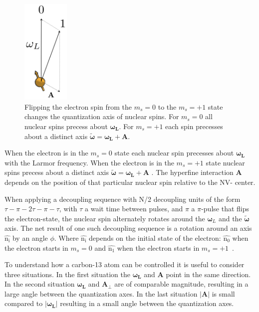 \begin{figure}[htbp]
\centering
\includegraphics[keepaspectratio,width=0.2\textwidth,height=0.75\textheight]{./img/QuantizationAxis.png}
\caption{Flipping the electron spin from the  $m_s=0$ to the $m_s= +1$ state changes the quantization axis of nuclear spins. For  $m_s=0$ all nuclear spins precess about $\bm{\omega_L}$. For  $m_s=+1$ each spin precesses about a distinct axis $\bm{\tilde{\omega}}=\bm{\omega_L} +\bm{A}$.}
\label{fig:quantax}
\end{figure}

When the electron is in the $m_s=0$ state each nuclear spin precesses about $\bm{\omega_L}$ with the Larmor frequency. When the electron is in the $m_s=+1$ state nuclear spins precess about a distinct axis $\bm{\tilde{\omega}}=\bm{\omega_L} +\bm{A}$ \citep{Taminiau2012Detection}. The hyperfine interaction $\bm{A}$ depends on the position of that particular nuclear spin relative to the NV- center.

When applying a decoupling sequence with N\slash 2 decoupling units of the form {$\tau - \pi -2\tau-\pi-\tau$}, with $\tau$ a wait time between pulses, and $\pi$ a $\pi$-pulse that flips the electron-state, the nuclear spin alternately rotates around the  $\bm\omega_L$ and the $\bm{\tilde{\omega}}$ axis. The net result of one such decoupling sequence is a rotation around an axis $\bm{\hat{\mathrm{n_i}}}$ by an angle $\phi$. Where $\bm{\hat{\mathrm{n_i}}}$ depends on the initial state of the electron: $\bm{\hat{\mathrm{n_0}}}$ when the electron starts in $m_s = 0$ and $\bm{\hat{\mathrm{n_1}}}$ when the electron starts in $m_s = +1$~\citep{Taminiau2012Detection}.

To understand how a carbon-13 atom can be controlled it is useful to consider three situations. In the first situation the $\bm{\omega_L}$ and $\bm{A}$ point in the same direction. In the second situation $\bm{\omega_L}$ and $\bm{A_\perp}$ are of comparable magnitude, resulting in a large angle between the quantization axes. In the last situation $|\bm{A}|$ is small compared to  $\bm{|\omega_L|}$ resulting in a small angle between the quantization axes.

